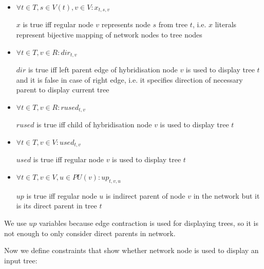 \documentclass[runningheads, envcountsame, a4paper]{llncs}
\begin{document}
\begin{itemize}

\item $\forall t \in T, s \in V(t), v \in V : x_{t,s,v}$

$x$ is true iff regular node $v$ represents node $s$ from tree $t$, i.e. $x$ literals represent bijective 
mapping of network nodes to tree nodes

\item $\forall t \in T, v \in R : dir_{t,v}$

$dir$ is true iff left parent edge of hybridisation node $v$ is used to display tree $t$ and it is false in case 
of right edge, i.e. it specifies direction of necessary parent to display current tree

\item $\forall t \in T, v \in R : rused_{t,v}$

$rused$ is true iff child of hybridisation node $v$ is used to display tree $t$

\item $\forall t \in T, v \in V : used_{t,v}$

$used$ is true iff regular node $v$ is used to display tree $t$

\item $\forall t \in T, v \in V, u \in PU(v) : up_{t,v,u}$

$up$ is true iff regular node $u$ is indirect parent of node $v$ in the network but it is its direct parent in tree $t$

\end{itemize}

We use $up$ variables because edge contraction is used for displaying trees, so it is not enough to only 
consider direct parents in network.

Now we define constraints that show whether network node is used to display an input tree:
\end{document}
